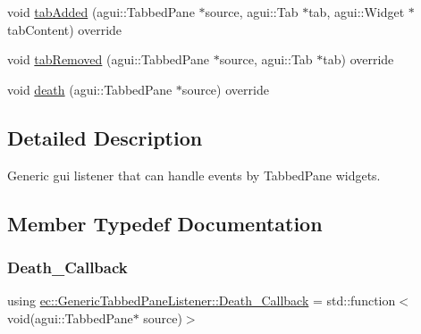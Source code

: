\begin{DoxyCompactItemize}
\item 
void \mbox{\hyperlink{classec_1_1_generic_tabbed_pane_listener_aa00e18c320111a63c11eb9500574585d}{tab\+Added}} (agui\+::\+Tabbed\+Pane $\ast$source, agui\+::\+Tab $\ast$tab, agui\+::\+Widget $\ast$tab\+Content) override
\item 
void \mbox{\hyperlink{classec_1_1_generic_tabbed_pane_listener_a8489d4a6e19fe55d24919ebf78e83d54}{tab\+Removed}} (agui\+::\+Tabbed\+Pane $\ast$source, agui\+::\+Tab $\ast$tab) override
\item 
void \mbox{\hyperlink{classec_1_1_generic_tabbed_pane_listener_aee95a52820d4f194c9bf726301f63240}{death}} (agui\+::\+Tabbed\+Pane $\ast$source) override
\end{DoxyCompactItemize}


\subsection{Detailed Description}
Generic gui listener that can handle events by Tabbed\+Pane widgets. 

\subsection{Member Typedef Documentation}
\mbox{\label{classec_1_1_generic_tabbed_pane_listener_a158699bc84b6a145e3dafec53ab63061}} 
\subsubsection{\texorpdfstring{Death\+\_\+\+Callback}{Death\_Callback}}
{\footnotesize\ttfamily using \mbox{\hyperlink{classec_1_1_generic_tabbed_pane_listener_a158699bc84b6a145e3dafec53ab63061}{ec\+::\+Generic\+Tabbed\+Pane\+Listener\+::\+Death\+\_\+\+Callback}} =  std\+::function$<$void(agui\+::\+Tabbed\+Pane$\ast$ source)$>$}

\mbox{\label{classec_1_1_generic_tabbed_pane_listener_a41097f0918f8888f9e970e9c9a5f0d52}} 
